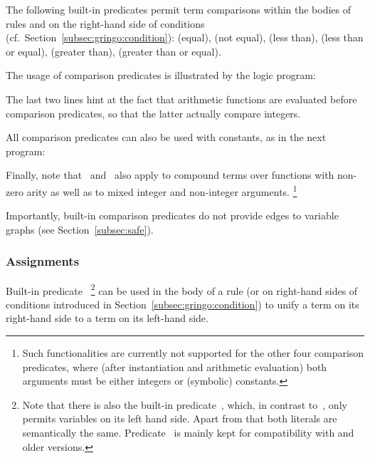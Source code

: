 The following built-in predicates permit term comparisons
within the bodies of rules and on the right-hand side of conditions
(cf.\ Section~\ref{subsec:gringo:condition}):
\code{==} (equal),
\code{!=} (not equal),
\code{<} (less than),
\code{<=} (less than or equal),
\code{>} (greater than),
\code{>=} (greater than or equal).

\begin{example}\label{ex:arith:pred}
The usage of comparison predicates is illustrated by the logic program:%
%

%
The last two lines hint at the fact that arithmetic functions are evaluated
before comparison predicates, so that the latter actually compare integers.

All comparison predicates can also be used with constants,
as in the next program:%
%

%
Finally, note that~\code{==} and~\code{!=} also apply to
compound terms over functions with non-zero arity as well as to
mixed integer and non-integer arguments.%
\footnote{%
  Such functionalities are currently not supported for the other four
  comparison predicates,
  where (after instantiation and arithmetic evaluation)
  both arguments must be either integers or (symbolic) constants.
}
\eexample
\end{example}

\begin{newstuff}
Importantly, built-in comparison predicates do not provide edges to variable graphs (see Section~\ref{subsec:safe}).
\end{newstuff}

\subsubsection{Assignments}\label{subsec:gringo:assign}

Built-in predicate~\code{:=}%
\footnote{Note that there is also the built-in predicate~\code{=},
which, in contrast to~\code{:=}, only permits variables on its left hand side.
Apart from that both literals are semantically the same.
Predicate~\code{=} is mainly kept for compatibility with \lparse{} and older \gringo{} versions.} 
can be used in the body of a rule
(or on right-hand sides of conditions introduced in Section~\ref{subsec:gringo:condition})
to unify a term on its right-hand side to a term on its left-hand side.


